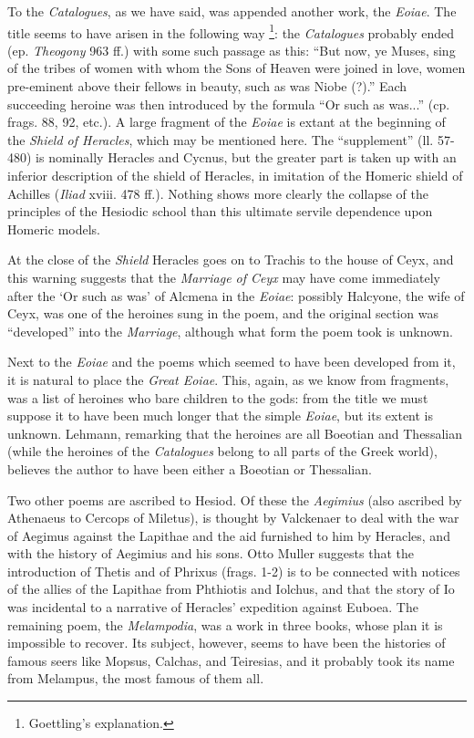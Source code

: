 To the \emph{Catalogues}, as we have said, was appended another work, the
\emph{Eoiae}. The title seems to have arisen in the following way \footnote{Goettling’s
explanation.}: the \emph{Catalogues} probably
ended (ep. \emph{Theogony} 963 ff.) with some such passage as this: “But
now, ye Muses, sing of the tribes of women with whom the Sons of Heaven were
joined in love, women pre-eminent above their fellows in beauty, such as was
Niobe (?).” Each succeeding heroine was then introduced by the formula
“Or such as was...” (cp. frags. 88, 92, etc.). A large fragment of
the \emph{Eoiae} is extant at the beginning of the \emph{Shield of Heracles},
which may be mentioned here. The “supplement” (ll. 57-480) is
nominally Heracles and Cycnus, but the greater part is taken up with an
inferior description of the shield of Heracles, in imitation of the Homeric
shield of Achilles (\emph{Iliad} xviii. 478 ff.). Nothing shows more clearly
the collapse of the principles of the Hesiodic school than this ultimate
servile dependence upon Homeric models.

At the close of the \emph{Shield} Heracles goes on to Trachis to the house of
Ceyx, and this warning suggests that the \emph{Marriage of Ceyx} may have come
immediately after the ‘Or such as was’ of Alcmena in the
\emph{Eoiae}: possibly Halcyone, the wife of Ceyx, was one of the heroines sung
in the poem, and the original section was “developed” into the
\emph{Marriage}, although what form the poem took is unknown.

Next to the \emph{Eoiae} and the poems which seemed to have been developed from
it, it is natural to place the \emph{Great Eoiae}. This, again, as we know from
fragments, was a list of heroines who bare children to the gods: from the title
we must suppose it to have been much longer that the simple \emph{Eoiae}, but
its extent is unknown. Lehmann, remarking that the heroines are all Boeotian
and Thessalian (while the heroines of the \emph{Catalogues} belong to all parts
of the Greek world), believes the author to have been either a Boeotian or
Thessalian.

Two other poems are ascribed to Hesiod. Of these the \emph{Aegimius} (also
ascribed by Athenaeus to Cercops of Miletus), is thought by Valckenaer to deal
with the war of Aegimus against the Lapithae and the aid furnished to him by
Heracles, and with the history of Aegimius and his sons. Otto Muller suggests
that the introduction of Thetis and of Phrixus (frags. 1-2) is to be connected
with notices of the allies of the Lapithae from Phthiotis and Iolchus, and that
the story of Io was incidental to a narrative of Heracles’ expedition
against Euboea. The remaining poem, the \emph{Melampodia}, was a work in three
books, whose plan it is impossible to recover. Its subject, however, seems to
have been the histories of famous seers like Mopsus, Calchas, and Teiresias,
and it probably took its name from Melampus, the most famous of them all.

